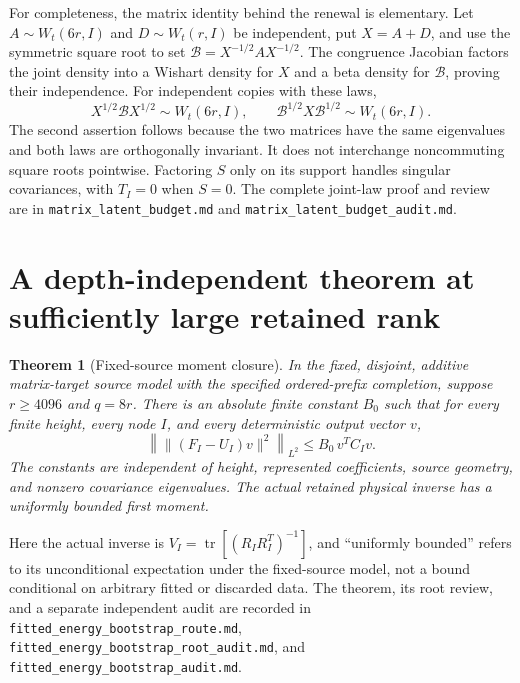 \documentclass[11pt,oneside,openany,a4paper]{report}
\numberwithin{equation}{chapter}
\newtheorem{theorem}{Theorem}[chapter]
\theoremstyle{definition}
\theoremstyle{remark}
\newcommand{\sourcefile}[1]{{\small\nolinkurl{#1}}}
\DeclareMathOperator{\tr}{tr}\DeclareMathOperator{\rank}{rank}
\begin{document}
For completeness, the matrix identity behind the renewal is elementary.
Let $A\sim W_t(6r,I)$ and $D\sim W_t(r,I)$ be independent, put
$X=A+D$, and use the symmetric square root to set
$\mathcal B=X^{-1/2}AX^{-1/2}$.  The congruence Jacobian factors the
joint density into a Wishart density for $X$ and a beta density for
$\mathcal B$, proving their independence.  For independent copies
with these laws,
\[
 X^{1/2}\mathcal B X^{1/2}\sim W_t(6r,I),
 \qquad
 \mathcal B^{1/2}X\mathcal B^{1/2}\sim W_t(6r,I).
\]
The second assertion follows because the two matrices have the same
eigenvalues and both laws are orthogonally invariant.  It does not
interchange noncommuting square roots pointwise.  Factoring $S$ only
on its support handles singular covariances, with $T_I=0$ when $S=0$.
The complete joint-law proof and review are in
\sourcefile{matrix_latent_budget.md} and
\sourcefile{matrix_latent_budget_audit.md}.

\section{A depth-independent theorem at sufficiently large retained rank}

\begin{theorem}[Fixed-source moment closure]
\label{thm:route-source-large-rank}
In the fixed, disjoint, additive matrix-target source model with the
specified ordered-prefix completion, suppose $r\geq4096$ and $q=8r$.
There is an absolute finite constant $B_0$ such that for every finite
height, every node $I$, and every deterministic output vector $v$,
\begin{equation}
 \left\|\lVert(F_I-U_I)v\rVert^2\right\|_{L^2}
 \leq B_0\,v^TC_Iv.
 \label{eq:route-large-rank-energy}
\end{equation}
The constants are independent of height, represented coefficients,
source geometry, and nonzero covariance eigenvalues.  The actual
retained physical inverse has a uniformly bounded first moment.
\end{theorem}

Here the actual inverse is
$V_I=\tr[(R_IR_I^T)^{-1}]$, and ``uniformly bounded'' refers to its
unconditional expectation under the fixed-source model, not a bound
conditional on arbitrary fitted or discarded data.  The theorem,
its root review, and a separate independent audit are recorded in
\sourcefile{fitted_energy_bootstrap_route.md},
\sourcefile{fitted_energy_bootstrap_root_audit.md}, and
\sourcefile{fitted_energy_bootstrap_audit.md}.
\end{document}
